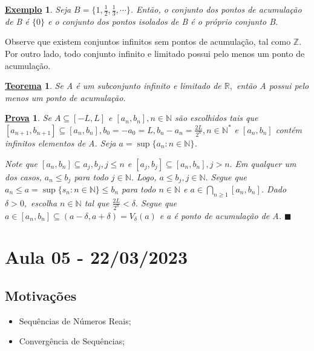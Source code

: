 \documentclass{article}
\newtheorem*{theorem*}{\underline{Teorema}}
\newtheorem{example}{\underline{Exemplo}}
\newtheorem*{proof*}{\underline{Prova}}
\renewcommand\qedsymbol{$\blacksquare$}
\begin{document}
\begin{example}
  Seja $B=\{1, \frac{1}{2}, \frac{1}{3}, \cdots\}$. Ent\~ao, o conjunto dos pontos de acumula\c c\~ao de B \'e $\{0\}$ e o conjunto dos pontos
isolados de B \'e o pr\'oprio conjunto B.
\end{example}
  Observe que existem conjuntos infinitos sem pontos de acumula\c c\~ao, tal como $\mathbb{Z}.$ Por outro lado, todo conjunto infinito e limitado possui
pelo menos um ponto de acumula\c c\~ao.
\begin{theorem*}
  Se A \'e um subconjunto infinito e limitado de $\mathbb{R},$ ent\~ao A possui pelo menos um ponto de acumula\c c\~ao.
\end{theorem*}
\begin{proof*}
  Se $A\subseteq{[-L, L]}$ e $[a_{n}, b_{n}], n\in \mathbb{N}$ s\~ao escolhidos tais que $[a_{n+1}, b_{n+1}]\subseteq{[a_{n}, b_{n}]}, b_{0} = -a_{0} = L,
  b_{n} - a_{n} = \frac{2L}{2^{n}}, n\in \mathbb{N}^*$ e $[a_{n}, b_{n}]$ cont\'em infinitos elementos de A. Seja $a = \sup{\{a_{n}: n\in \mathbb{N}\}}$.

  Note que $[a_{n}, b_{n}]\subseteq{a_{j}, b_{j}}, j\leq{n}$ e $[a_{j}, b_{j}]\subseteq{[a_{n}, b_{n}]}, j>n.$ Em qualquer um dos casos, $a_{n}\leq{b_{j}}$
para todo $j\in \mathbb{N}$. Logo, $a \leq{b_{j}}, j\in \mathbb{N}.$ Segue que $a_{n}\leq{a=\sup \{s_{n}: n\in \mathbb{N}\}}\leq{b_{n}}$ para todo
$n\in \mathbb{N}$ e $a\in\displaystyle\bigcap_{n\geq{1}}[a_{n}, b_{n}]$. Dado $\delta > 0,$ escolha $n\in \mathbb{N}$ tal que $\frac{2L}{2^{n}}<\delta.$ Segue
que $a\in[a_{n}, b_{n}]\subseteq{(a-\delta, a+\delta) = V_{\delta}(a)}$ e a \'e ponto de acumula\c c\~ao de A. \qedsymbol
\end{proof*}
\newpage

\section{Aula 05 - 22/03/2023}
\subsection{Motiva\c c\~oes}
\begin{itemize}
  \item Sequ\^encias de N\'umeros Reais;
  \item Converg\^encia de Sequ\^encias;
\end{itemize}
\end{document}
